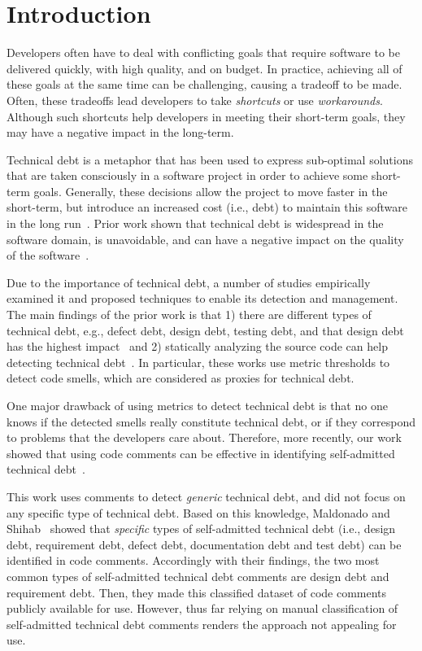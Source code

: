 \documentclass{sig-alternate}
\newcommand{\SATD}{self-admitted technical debt\xspace}
\begin{document}
\section{Introduction}
\label{sec:introduction}
Developers often have to deal with conflicting goals that require software to be delivered quickly, with high quality, and on budget. In practice, achieving all of these goals at the same time can be challenging, causing a tradeoff to be made. Often, these tradeoffs lead developers to take \emph{shortcuts} or use \emph{workarounds}. Although such shortcuts help developers in meeting their short-term goals, they may have a negative impact in the long-term.

Technical debt is a metaphor that has been used to express sub-optimal solutions that are taken consciously in a software project in order to achieve some short-term goals. Generally, these decisions allow the project to move faster in the short-term, but introduce an increased cost (i.e., debt) to maintain this software in the long run~\cite{Seaman2011,Kruchten2013IWMTD}. Prior work shown that technical debt is widespread in the software domain, is unavoidable, and can have a negative impact on the quality of the software~\cite{Lim2012Software}.

Due to the importance of technical debt, a number of studies empirically examined it and proposed techniques to enable its detection and management. The main findings of the prior work is that 1) there are different types of technical debt, e.g., defect debt, design debt, testing debt, and that design debt has the highest impact~\cite{Alves2014MTD,Marinescu2012IBM} and 2) statically analyzing the source code can help detecting technical debt~\cite{Marinescu2004ICSM,Marinescu2010CSMR,Zazworka2013CSE}. In particular, these works use metric thresholds to detect code smells, which are considered as proxies for technical debt. 

One major drawback of using metrics to detect technical debt is that no one knows if the detected smells really constitute technical debt, or if they correspond to problems that the developers care about. Therefore, more recently, our work showed that using code comments can be effective in identifying self-admitted technical debt~\cite{Potdar2014ICSME}. 

This work uses comments to detect \emph{generic} technical debt, and did not focus on any specific type of technical debt. Based on this knowledge, Maldonado and Shihab~\cite{Maldonado2015MTD} showed that \emph{specific} types of self-admitted technical debt (i.e., design debt, requirement debt, defect debt, documentation debt and test debt) can be identified in code comments. Accordingly with their findings, the two most common types of \SATD comments are design debt and requirement debt. Then, they made this classified dataset of code comments publicly available for use. However, thus far relying on manual classification of \SATD comments renders the approach not appealing for use.
\end{document}
